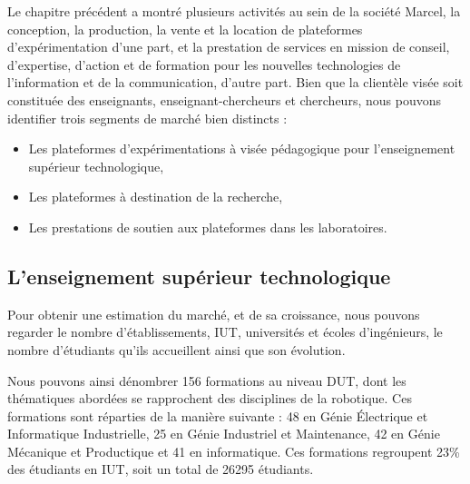 \documentclass[a4paper,12pt]{report}
\begin{document}
Le chapitre précédent a montré plusieurs activités au sein de la société Marcel, la conception, la production, la vente et la location de plateformes d’expérimentation d'une part,
et la prestation de services en mission de conseil, d’expertise, d’action et de formation pour les nouvelles technologies de l’information et de la communication, d'autre part.
Bien que la clientèle visée soit constituée des enseignants, enseignant-chercheurs et chercheurs, nous pouvons identifier trois segments de marché bien distincts :
\begin{itemize}
	\item Les plateformes d'expérimentations à visée pédagogique pour l'enseignement supérieur technologique,
	\item Les plateformes à destination de la recherche,
	\item Les prestations de soutien aux plateformes dans les laboratoires.
\end{itemize}

\subsection{L'enseignement supérieur technologique}
Pour obtenir une estimation du marché, et de sa croissance, nous pouvons regarder le nombre d'établissements, IUT, universités et écoles d'ingénieurs, 
le nombre d'étudiants qu'ils accueillent ainsi que son évolution.

Nous pouvons ainsi dénombrer 156 formations au niveau DUT, dont les thématiques abordées se rapprochent des disciplines de la robotique.
Ces formations sont réparties de la manière suivante : 48 en Génie Électrique et Informatique Industrielle, 25 en Génie Industriel et Maintenance, 
42 en Génie Mécanique et Productique et 41 en informatique.
Ces formations regroupent 23\% des étudiants en IUT, soit un total de 26295 étudiants.
\end{document}
